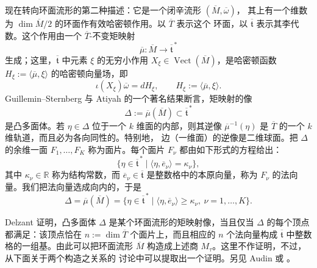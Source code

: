 现在转向环面流形的第二种描述：它是一个闭辛流形 $(\overline M,\overline\omega)$，
其上有一个维数为 $\dim\overline M/2$ 的环面作有效哈密顿作用。以 $\overline T$ 表示这个
环面，以 $\overline{\mathfrak t}$ 表示其李代数。这个作用由一个
$\overline T$-不变矩映射
\[
  \overline\mu:\overline M\longrightarrow\overline{\mathfrak t}^{\,*}
\]
生成；这里，$\overline{\mathfrak t}$ 中元素 $\xi$ 的无穷小作用
$X_\xi\in\operatorname{Vect}(\overline M)$，是哈密顿函数
$H_\xi:=\langle\overline\mu,\xi\rangle$ 的哈密顿向量场，即
\[
  \iota(X_\xi)\overline\omega=dH_\xi,
  \qquad H_\xi:=\langle\overline\mu,\xi\rangle.
\]
Guillemin--Sternberg 与 Atiyah 的一个著名结果断言，矩映射的像
\[
  \Delta:=\overline\mu(\overline M)\subset\overline{\mathfrak t}^{\,*}
\]
是凸多面体。若 $\eta\in\Delta$ 位于一个 $k$ 维面的内部，则其逆像
$\overline\mu^{-1}(\eta)$ 是 $\overline T$ 的一个 $k$ 维轨道，而且必为各向同性的。特别地，
边（一维面）的逆像是二维球面。把 $\Delta$ 的余维一面
$F_1,\ldots,F_K$ 称为面片。每个面片 $F_\nu$ 都由如下形式的方程给出：
\[
  \{\eta\in\overline{\mathfrak t}^{\,*}\mid
    \langle\eta,\overline e_\nu\rangle=\kappa_\nu\},
\]
其中 $\kappa_\nu\in\mathbb R$ 称为结构常数，而
$\overline e_\nu\in\overline{\mathfrak t}$ 是整数格中的本原向量，称为
$F_\nu$ 的法向量。我们把法向量选成向内的，于是
\[
  \Delta=\overline\mu(\overline M)
  =\{\eta\in\overline{\mathfrak t}^{\,*}\mid
  \langle\eta,\overline e_\nu\rangle\geq\kappa_\nu,
  \ \nu=1,\ldots,K\}.
\]

Delzant  证明，凸多面体 $\Delta$ 是某个环面流形的矩映射像，当且仅当
$\Delta$ 的每个顶点都满足：该顶点恰在 $n:=\dim\overline T$ 个面片上，而且相应的 $n$
个法向量构成 $\overline{\mathfrak t}$ 中整数格的一组基。由此可以把环面流形
$\overline M$ 构造成上述商 $M_\tau$。这里不作证明，不过，从下面关于两个构造之关系的
讨论中可以提取出一个证明。另见 Audin  或 。

